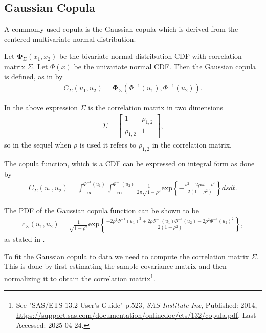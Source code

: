 \documentclass[%
a4paper,							
11pt,								
bibliography=totoc,						
abstracton=true					
]
{scrartcl}
\theoremstyle{plain}
\theoremstyle{definition}
\theoremstyle{remark}
\newcommand{\1}{\mathbbm{1}}
\begin{document}
\subsection{Gaussian Copula}\label{sec:GaussianCopula}
A commonly used copula is the Gaussian copula which is derived from the centered multivariate normal distribution. 

Let $\boldsymbol{\Phi}_\Sigma(x_1,x_2)$ be the bivariate normal distribution \gls{CDF} with correlation matrix $\Sigma$. Let $\Phi(x)$ be the univariate normal \gls{CDF}. Then the Gaussian copula is defined, as in \citet[p.~112]{Umberto2004copulaMethods}  by 
\begin{align*}
    C_\Sigma(u_1,u_2) = \boldsymbol{\Phi}_\Sigma(\Phi^{-1}(u_1),\Phi^{-1}(u_2)).
\end{align*}

In the above expression $\Sigma$ is the correlation matrix in two dimensions 
\begin{align*}
    \Sigma = 
    \begin{bmatrix}
            1 & \rho_{1,2} \\
            \rho_{1,2} & 1
    \end{bmatrix},
\end{align*}
so in the sequel when $\rho$ is used it refers to $\rho_{1,2}$ in the correlation matrix.

The copula function, which is a \gls{CDF} can be expressed on integral form as done by \citet[p.~112]{Umberto2004copulaMethods}
\begin{align*}
     C_{\Sigma} (u_1,u_2)
    = \int_{-\infty}^{\Phi^{-1}(u_1)}\int_{-\infty}^{\Phi^{-1}(u_2)}
    \frac{1}{2\pi\sqrt{1-\rho^2}} \mathrm{exp}\left\{ - \frac{s^2-2\rho st+t^2}{2(1-\rho^2)}   \right\} dsdt.
\end{align*} 

The \gls{PDF} of the Gaussian copula function can be shown to be 
\begin{align*}
     c_{\Sigma} (u_1,u_2)
    = \frac{1}{\sqrt{1-\rho^2}} \mathrm{exp}\left\{  \frac{-2\rho^2\Phi^{-1}(u_1)^2  +2\rho \Phi^{-1}(u_1)\Phi^{-1}(u_2) -2\rho^2\Phi^{-1}(u_2)^2}{2(1-\rho^2)}   \right\},
\end{align*}
as stated in \citet[p.267]{Alexander2008}.



To fit the Gaussian copula to data we need to compute the correlation matrix $\Sigma$. This is done by first estimating the sample covariance matrix and then normalizing it to obtain the correlation matrix\footnote{See "SAS/ETS\textsuperscript{\textregistered} 13.2 User's Guide" p.523, \textit{SAS Institute Inc}, Published: 2014, \url{https://support.sas.com/documentation/onlinedoc/ets/132/copula.pdf}, Last Accessed: 2025-04-24.}.%
\end{document}
